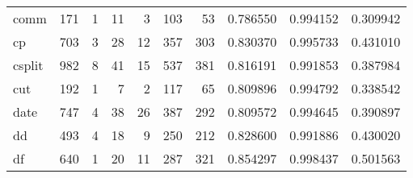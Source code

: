 \begin{tabular}{lrrrrrrrrr}
comm      &                    171 &                                  1 &                                11 &                                3 &                               103 &                              53 &                                0.786550 &                               0.994152 &                             0.309942 \\
cp        &                    703 &                                  3 &                                28 &                               12 &                               357 &                             303 &                                0.830370 &                               0.995733 &                             0.431010 \\
csplit    &                    982 &                                  8 &                                41 &                               15 &                               537 &                             381 &                                0.816191 &                               0.991853 &                             0.387984 \\
cut       &                    192 &                                  1 &                                 7 &                                2 &                               117 &                              65 &                                0.809896 &                               0.994792 &                             0.338542 \\
date      &                    747 &                                  4 &                                38 &                               26 &                               387 &                             292 &                                0.809572 &                               0.994645 &                             0.390897 \\
dd        &                    493 &                                  4 &                                18 &                                9 &                               250 &                             212 &                                0.828600 &                               0.991886 &                             0.430020 \\
df        &                    640 &                                  1 &                                20 &                               11 &                               287 &                             321 &                                0.854297 &                               0.998437 &                             0.501563 \\

\end{tabular}
